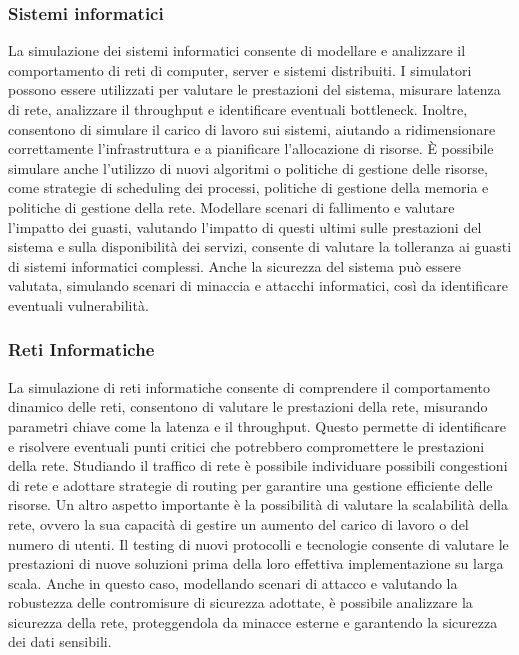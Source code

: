\documentclass[12pt,a4paper,openright,twoside]{book}
\begin{document}
\subsubsection{Sistemi informatici}
La simulazione dei sistemi informatici consente di modellare e analizzare il comportamento di reti di computer, server e sistemi distribuiti. 
I simulatori possono essere utilizzati per valutare le prestazioni del sistema, misurare latenza di rete, analizzare il throughput e identificare eventuali bottleneck. Inoltre, consentono di simulare il carico di lavoro sui sistemi, aiutando a ridimensionare correttamente l'infrastruttura e a pianificare l'allocazione di risorse. 
È possibile simulare anche l'utilizzo di nuovi algoritmi o politiche di gestione delle risorse, come strategie di scheduling dei processi, politiche di gestione della memoria e politiche di gestione della rete.
Modellare scenari di fallimento e valutare l'impatto dei guasti, valutando l'impatto di questi ultimi sulle prestazioni del sistema e sulla disponibilità dei servizi, consente di valutare la tolleranza ai guasti di sistemi informatici complessi. 
Anche la sicurezza del sistema può essere valutata, simulando scenari di minaccia e attacchi informatici, così da identificare eventuali vulnerabilità.

\subsubsection{Reti Informatiche}
La simulazione di reti informatiche consente di comprendere il comportamento dinamico delle reti, consentono di valutare le prestazioni della rete, misurando parametri chiave come la latenza e il throughput. Questo permette di identificare e risolvere eventuali punti critici che potrebbero compromettere le prestazioni della rete. 
Studiando il traffico di rete è possibile individuare possibili congestioni di rete e adottare strategie di routing per garantire una gestione efficiente delle risorse. 
Un altro aspetto importante è la possibilità di valutare la scalabilità della rete, ovvero la sua capacità di gestire un aumento del carico di lavoro o del numero di utenti. 
Il testing di nuovi protocolli e tecnologie consente di valutare le prestazioni di nuove soluzioni prima della loro effettiva implementazione su larga scala. 
Anche in questo caso, modellando scenari di attacco e valutando la robustezza delle contromisure di sicurezza adottate, è possibile analizzare la sicurezza della rete, proteggendola da minacce esterne e garantendo la sicurezza dei dati sensibili. 
\end{document}
